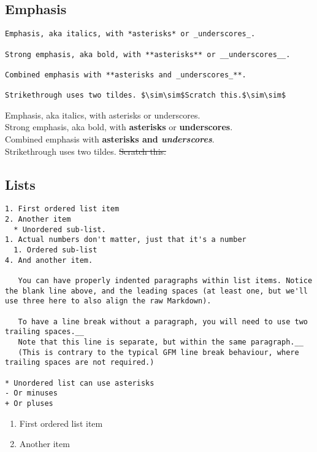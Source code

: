 \documentclass[a4paper, 11pt]{gfm}
\begin{document}
\subsection{Emphasis}

\begin{lstlisting}
Emphasis, aka italics, with *asterisks* or _underscores_.

Strong emphasis, aka bold, with **asterisks** or __underscores__.

Combined emphasis with **asterisks and _underscores_**.

Strikethrough uses two tildes. $\sim\sim$Scratch this.$\sim\sim$
\end{lstlisting}

Emphasis, aka italics, with asterisks or underscores. \\

Strong emphasis, aka bold, with \textbf{asterisks} or \textbf{underscores}. \\

Combined emphasis with \textbf{asterisks and \textit{underscores}}. \\

Strikethrough uses two tildes. \sout{Scratch this.}


\subsection{Lists}

\begin{lstlisting}
1. First ordered list item
2. Another item
  * Unordered sub-list.
1. Actual numbers don't matter, just that it's a number
  1. Ordered sub-list
4. And another item.

   You can have properly indented paragraphs within list items. Notice the blank line above, and the leading spaces (at least one, but we'll use three here to also align the raw Markdown).

   To have a line break without a paragraph, you will need to use two trailing spaces.__
   Note that this line is separate, but within the same paragraph.__
   (This is contrary to the typical GFM line break behaviour, where trailing spaces are not required.)

* Unordered list can use asterisks
- Or minuses
+ Or pluses
\end{lstlisting}

\begin{enumerate}
  \item First ordered list item
  \item Another item
\end{enumerate}
\end{document}

